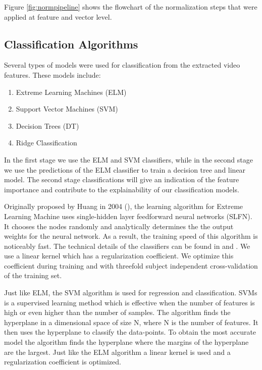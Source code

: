 Figure \ref{fig:normpipeline} shows the flowchart of the normalization steps that were applied at feature and vector level. 



\subsection{Classification Algorithms}
\label{subsection:classificaiton}
Several types of models were used for classification from the extracted video features. These models include:
\begin{enumerate}
\item Extreme Learning Machines (ELM)
\item Support Vector Machines (SVM)
\item Decision Trees (DT)
\item Ridge Classification
\end{enumerate}
In the first stage we use the ELM and SVM classifiers, while in the second stage we use the predictions of the ELM classifier to train a decision tree and linear model. The second stage classifications will give an indication of the feature importance and contribute to the explainability of our classification models. 

Originally proposed by Huang in 2004 (\cite{huang2004extreme}), the learning algorithm for Extreme Learning Machine uses single-hidden layer feedforward neural networks (SLFN). It chooses the nodes randomly and analytically determines the the output weights for the neural network. As a result, the training speed of this algorithm is noticeably fast. The technical details of the classifiers can be found in \cite{huang2004extreme} and \cite{huang2006extreme}. We use a linear kernel which has a regularization coefficient. We optimize this coefficient during training and with threefold subject independent cross-validation of the training set. 

Just like ELM, the SVM algorithm is used for regression and classification. SVMs is a supervised learning method which is effective when the number of features is high or even higher than the number of samples. The algorithm finds the hyperplane in a dimensional space of size N, where N is the number of features. It then uses the hyperplane to classify the data-points. To obtain the most accurate model the algorithm finds the hyperplane where the margins of the hyperplane are the largest. Just like the ELM algorithm a linear kernel is used and a regularization coefficient is optimized. 

